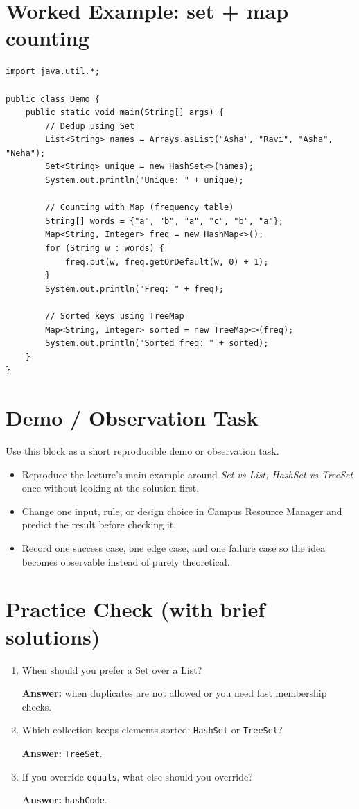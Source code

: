 \documentclass[11pt]{article}
\begin{document}
\section{Worked Example: set + map counting}
\begin{lstlisting}
import java.util.*;

public class Demo {
    public static void main(String[] args) {
        // Dedup using Set
        List<String> names = Arrays.asList("Asha", "Ravi", "Asha", "Neha");
        Set<String> unique = new HashSet<>(names);
        System.out.println("Unique: " + unique);

        // Counting with Map (frequency table)
        String[] words = {"a", "b", "a", "c", "b", "a"};
        Map<String, Integer> freq = new HashMap<>();
        for (String w : words) {
            freq.put(w, freq.getOrDefault(w, 0) + 1);
        }
        System.out.println("Freq: " + freq);

        // Sorted keys using TreeMap
        Map<String, Integer> sorted = new TreeMap<>(freq);
        System.out.println("Sorted freq: " + sorted);
    }
}
\end{lstlisting}

\section{Demo / Observation Task}
Use this block as a short reproducible demo or observation task.
\begin{itemize}
  \item Reproduce the lecture's main example around \textit{Set vs List; HashSet vs TreeSet} once without looking at the solution first.
  \item Change one input, rule, or design choice in Campus Resource Manager and predict the result before checking it.
  \item Record one success case, one edge case, and one failure case so the idea becomes observable instead of purely theoretical.
\end{itemize}
\notesources{\OOPSUnitVSources}

\section{Practice Check (with brief solutions)}
\begin{enumerate}
  \item When should you prefer a Set over a List?\par
  \textbf{Answer:} when duplicates are not allowed or you need fast membership checks.

  \item Which collection keeps elements sorted: \texttt{HashSet} or \texttt{TreeSet}?\par
  \textbf{Answer:} \texttt{TreeSet}.

  \item If you override \texttt{equals}, what else should you override?\par
  \textbf{Answer:} \texttt{hashCode}.
\end{enumerate}
\end{document}
